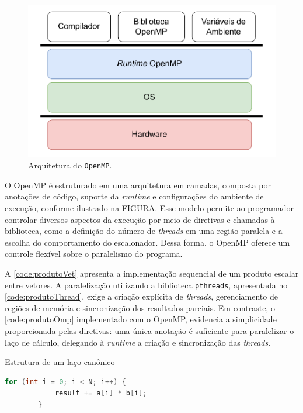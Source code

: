 \begin{figure}[htb]
    \caption{Arquitetura do \texttt{OpenMP}.}
    \label{fig:ompArchitecture}
    \includegraphics[scale=0.7]{figuras/omp_architecture.pdf}
    \fonte{}
\end{figure}

O OpenMP é estruturado em uma arquitetura em camadas, composta por anotações de código, suporte da \textit{runtime} e configurações do ambiente de execução, conforme ilustrado na FIGURA. Esse modelo permite ao programador controlar diversos aspectos da execução por meio de diretivas e chamadas à biblioteca, como a definição do número de \textit{threads} em uma região paralela e a escolha do comportamento do escalonador. Dessa forma, o OpenMP oferece um controle flexível sobre o paralelismo do programa.

A \autoref{code:produtoVet} apresenta a implementação sequencial de um produto escalar entre vetores. A paralelização utilizando a biblioteca \texttt{pthreads}, apresentada no \autoref{code:produtoThread}, exige a criação explícita de \textit{threads}, gerenciamento de regiões de memória e sincronização dos resultados parciais. Em contraste, o \autoref{code:produtoOmp} implementado com o OpenMP, evidencia a simplicidade proporcionada pelas diretivas: uma única anotação é suficiente para paralelizar o laço de cálculo, delegando à \textit{runtime} a criação e sincronização das \textit{threads}.

\begin{sourcecode}[htb]\caption{\label{code:produtoVet}Estrutura de um laço canônico}
    \begin{lstlisting}[frame=single, language=C++]
        for (int i = 0; i < N; i++) {
            result += a[i] * b[i];
        }
    \end{lstlisting}
    \fonte{}
\end{sourcecode}

